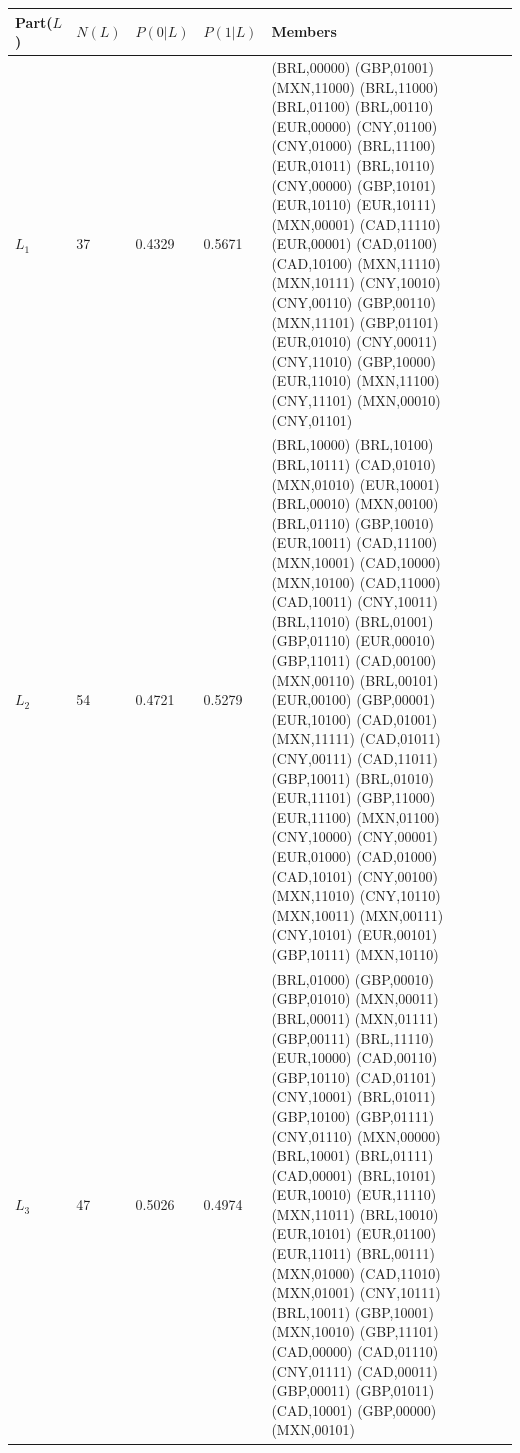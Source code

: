\begin{tabular}{lllll}
\toprule
Part($L$) & $N(L)$ & $P(0|L)$ & $P(1|L)$ & Members \\
\midrule
$L_{1}$ & 37 & 0.4329 & 0.5671 &
  \begin{minipage}[t]{0.55\textwidth}\raggedright\scriptsize
  (BRL,00000) (GBP,01001) (MXN,11000) (BRL,11000) (BRL,01100)
  (BRL,00110) (EUR,00000) (CNY,01100) (CNY,01000) (BRL,11100)
  (EUR,01011) (BRL,10110) (CNY,00000) (GBP,10101) (EUR,10110)
  (EUR,10111) (MXN,00001) (CAD,11110) (EUR,00001) (CAD,01100)
  (CAD,10100) (MXN,11110) (MXN,10111) (CNY,10010) (CNY,00110)
  (GBP,00110) (MXN,11101) (GBP,01101) (EUR,01010) (CNY,00011)
  (CNY,11010) (GBP,10000) (EUR,11010) (MXN,11100) (CNY,11101)
  (MXN,00010) (CNY,01101)
  \end{minipage} \\[2pt]
$L_{2}$ & 54 & 0.4721 & 0.5279 &
  \begin{minipage}[t]{0.55\textwidth}\raggedright\scriptsize
  (BRL,10000) (BRL,10100) (BRL,10111) (CAD,01010) (MXN,01010)
  (EUR,10001) (BRL,00010) (MXN,00100) (BRL,01110) (GBP,10010)
  (EUR,10011) (CAD,11100) (MXN,10001) (CAD,10000) (MXN,10100)
  (CAD,11000) (CAD,10011) (CNY,10011) (BRL,11010) (BRL,01001)
  (GBP,01110) (EUR,00010) (GBP,11011) (CAD,00100) (MXN,00110)
  (BRL,00101) (EUR,00100) (GBP,00001) (EUR,10100) (CAD,01001)
  (MXN,11111) (CAD,01011) (CNY,00111) (CAD,11011) (GBP,10011)
  (BRL,01010) (EUR,11101) (GBP,11000) (EUR,11100) (MXN,01100)
  (CNY,10000) (CNY,00001) (EUR,01000) (CAD,01000) (CAD,10101)
  (CNY,00100) (MXN,11010) (CNY,10110) (MXN,10011) (MXN,00111)
  (CNY,10101) (EUR,00101) (GBP,10111) (MXN,10110)
  \end{minipage} \\[2pt]
$L_{3}$ & 47 & 0.5026 & 0.4974 &
  \begin{minipage}[t]{0.55\textwidth}\raggedright\scriptsize
  (BRL,01000) (GBP,00010) (GBP,01010) (MXN,00011) (BRL,00011)
  (MXN,01111) (GBP,00111) (BRL,11110) (EUR,10000) (CAD,00110)
  (GBP,10110) (CAD,01101) (CNY,10001) (BRL,01011) (GBP,10100)
  (GBP,01111) (CNY,01110) (MXN,00000) (BRL,10001) (BRL,01111)
  (CAD,00001) (BRL,10101) (EUR,10010) (EUR,11110) (MXN,11011)
  (BRL,10010) (EUR,10101) (EUR,01100) (EUR,11011) (BRL,00111)
  (MXN,01000) (CAD,11010) (MXN,01001) (CNY,10111) (BRL,10011)
  (GBP,10001) (MXN,10010) (GBP,11101) (CAD,00000) (CAD,01110)
  (CNY,01111) (CAD,00011) (GBP,00011) (GBP,01011) (CAD,10001)
  (GBP,00000) (MXN,00101)
  \end{minipage} \\[2pt]

\end{tabular}
